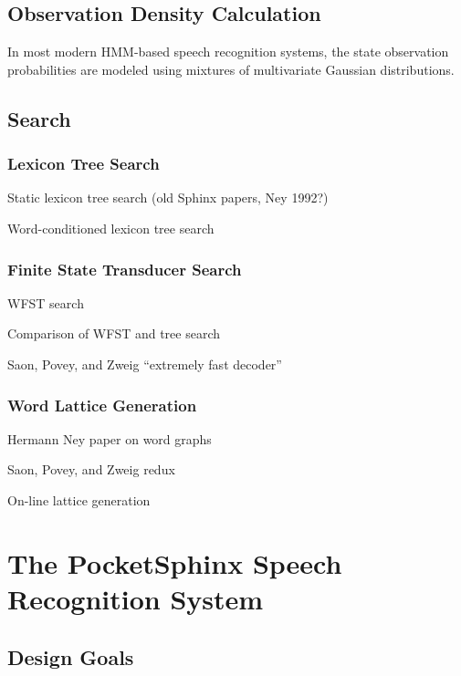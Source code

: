 \documentclass{article}
\begin{document}
\subsection{Observation Density Calculation}
\label{sec:gmm}

In most modern HMM-based speech recognition systems, the state
observation probabilities are modeled using mixtures of multivariate
Gaussian distributions.

\subsection{Search}
\label{sec:search}

\subsubsection{Lexicon Tree Search}
\label{sec:lextree}

Static lexicon tree search (old Sphinx papers, Ney 1992?)

Word-conditioned lexicon tree search \cite{kanthak2000}

\subsubsection{Finite State Transducer Search}
\label{sec:fst}

WFST search \cite{mohri2000}

Comparison of WFST and tree search \cite{kanthak2002}

Saon, Povey, and Zweig ``extremely fast decoder'' \cite{saon2006}

\subsubsection{Word Lattice Generation}
\label{sec:lattice}

Hermann Ney paper on word graphs

Saon, Povey, and Zweig redux

On-line lattice generation \cite{sagerer1996}

\section{The PocketSphinx Speech Recognition System}
\label{sec:pocketsphinx}

\subsection{Design Goals}
\label{sec:design}
\end{document}
